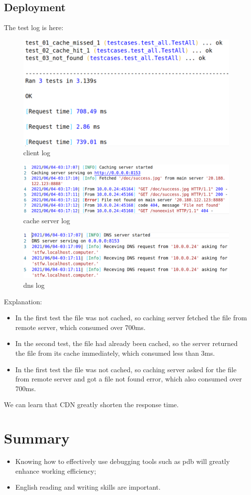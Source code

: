 \documentclass[12pt,a4paper,UTF8]{article}
\begin{document}
\newpage
\subsection{Deployment}
The test log is here:
\begin{figure}[htbp]
	\centering
	\includegraphics[width=\textwidth]{4}
	\caption{client log}
\end{figure}
\begin{figure}[htbp]
	\centering
	\includegraphics[width=\textwidth]{5}
	\caption{cache server log}
\end{figure}
\begin{figure}[htbp]
	\centering
	\includegraphics[width=\textwidth]{6}
	\caption{dns log}
\end{figure}
\newpage
Explanation:
\begin{itemize}
	\item In the first test the file was not cached, so caching server fetched the file from remote server, which consumed over 700ms.
	\item In the second test, the file had already been cached, so the server returned the file from its cache immediately, which consumed less than 3ms.
	\item In the first test the file was not cached, so caching server asked for the file from remote server and got a file not found error, which also consumed over 700ms.
\end{itemize}
We can learn that CDN greatly shorten the response time.

\section{Summary}
\begin{itemize}
	\item Knowing how to effectively use debugging tools such as pdb will greatly enhance working efficiency;
	\item English reading and writing skills are important.
\end{itemize}
\end{document}
